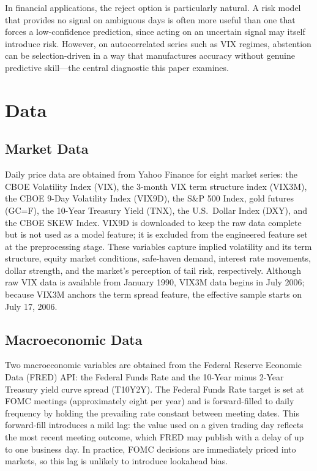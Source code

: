 \documentclass[11pt]{article}
\begin{document}
In financial applications, the reject option is particularly natural. A risk model that provides no signal on ambiguous days is often more useful than one that forces a low-confidence prediction, since acting on an uncertain signal may itself introduce risk. However, on autocorrelated series such as VIX regimes, abstention can be selection-driven in a way that manufactures accuracy without genuine predictive skill---the central diagnostic this paper examines.

\section{Data}
\label{sec:data}

\subsection{Market Data}

Daily price data are obtained from Yahoo Finance for eight market series: the CBOE Volatility Index (VIX), the 3-month VIX term structure index (VIX3M), the CBOE 9-Day Volatility Index (VIX9D), the S\&P 500 Index, gold futures (GC=F), the 10-Year Treasury Yield (TNX), the U.S.\ Dollar Index (DXY), and the CBOE SKEW Index. VIX9D is downloaded to keep the raw data complete but is not used as a model feature; it is excluded from the engineered feature set at the preprocessing stage. These variables capture implied volatility and its term structure, equity market conditions, safe-haven demand, interest rate movements, dollar strength, and the market's perception of tail risk, respectively. Although raw VIX data is available from January 1990, VIX3M data begins in July 2006; because VIX3M anchors the term spread feature, the effective sample starts on July 17, 2006.

\subsection{Macroeconomic Data}

Two macroeconomic variables are obtained from the Federal Reserve Economic Data (FRED) API: the Federal Funds Rate and the 10-Year minus 2-Year Treasury yield curve spread (T10Y2Y). The Federal Funds Rate target is set at FOMC meetings (approximately eight per year) and is forward-filled to daily frequency by holding the prevailing rate constant between meeting dates. This forward-fill introduces a mild lag: the value used on a given trading day reflects the most recent meeting outcome, which FRED may publish with a delay of up to one business day. In practice, FOMC decisions are immediately priced into markets, so this lag is unlikely to introduce lookahead bias.
\end{document}
